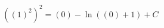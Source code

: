 \documentclass[preview]{standalone}
\begin{document}
\begin{align*}
{ \left({ \left(1\right) }^{2}\right) }^{2} = \left( 0 \right) - \ln \left( \left( 0 \right) + 1 \right) + C
\end{align*}
\end{document}
